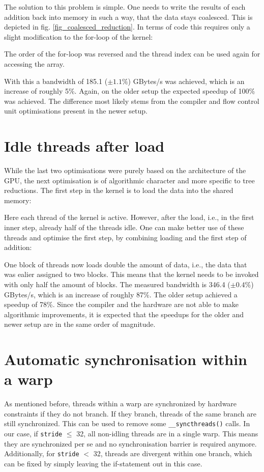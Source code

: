 The solution to this problem is simple.
One needs to write the results of each addition back into memory in such a way, that the data stays coalesced.
This is depicted in fig. \ref{fig_coalesced_reduction}.
In terms of code this requires only a slight modification to the for-loop of the kernel:

The order of the for-loop was reversed and the thread index can be used again for accessing the array.

With this a bandwidth of 185.1 (\( \pm 1.1\% \)) GBytes/s was achieved, which is an increase of roughly 5\%.
Again, on the older setup the expected speedup of 100\% was achieved.
The difference most likely stems from the compiler and flow control unit optimisations present in the newer setup.


\section{Idle threads after load}
While the last two optimisations were purely based on the architecture of the GPU, the next optimisation is of algorithmic character and more specific to tree reductions.
The first step in the kernel is to load the data into the shared memory:

Here each thread of the kernel is active.
However, after the load, i.e., in the first inner step, already half of the threads idle.
One can make better use of these threads and optimise the first step, by combining loading and the first step of addition:

One block of threads now loads double the amount of data, i.e., the data that was ealier assigned to two blocks.
This means that the kernel needs to be invoked with only half the amount of blocks.
The measured bandwidth is 346.4 (\( \pm 0.4\% \)) GBytes/s, which is an increase of roughly 87\%.
The older setup achieved a speedup of 78\%.
Since the compiler and the hardware are not able to make algorithmic improvements, it is expected that the speedups for the older and newer setup are in the same order of magnitude.

\section{Automatic synchronisation within a warp}
As mentioned before, threads within a warp are synchronized by hardware constraints if they do not branch.
If they branch, threads of the same branch are still synchronized.
This can be used to remove some \texttt{\_\_syncthreads()} calls.
In our case, if \texttt{stride} \(\le\) 32, all non-idling threads are in a single warp. 
This means they are synchronized per se and no synchronisation barrier is required anymore.
Additionally, for \texttt{stride} \(<\) 32, threads are divergent within one branch, which can be fixed by simply leaving the if-statement out in this case.

